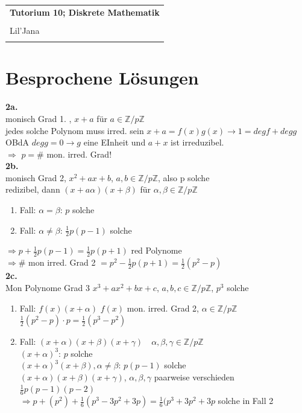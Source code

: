 \documentclass{article} %
\newcommand{\titulo}{Tutorium 10; Diskrete Mathematik}
\newcommand{\nombre}{Lil'Jana}
\begin{document}
\begin{tabular}{p{12cm}}
{{\Large\bf\titulo}}\\
\vspace{0.2cm}\\
 {\large\nombre}\\
 \vspace{0.1cm}
\end{tabular} 
\section*{Besprochene Lösungen}
\textbf{2a.} \\
monisch Grad 1. , $x +a $ für $a \in \mathbb{Z}/ p \mathbb{Z}$ \\
jedes solche Polynom muss irred. sein $x+a = f(x)g(x) \rightarrow 1 = deg f + deg g$  \\
OBdA $deg g = 0 \rightarrow g$ eine EInheit und $a+x$ ist irreduzibel. \\
$\Rightarrow$ $p = \#$ mon. irred. Grad! \\ \newline
\textbf{2b.}\\
monisch Grad 2, $x^2 +ax+b$, $a,b \in \mathbb{Z}/p \mathbb{Z}$, also p solche \\
redizibel, dann $(x+a\alpha)(x+\beta)$ für $\alpha, \beta \in \mathbb{Z}/ p \mathbb{Z}$
\begin{enumerate}
    \item Fall: $\alpha = \beta$: $p$ solche
    \item Fall: $\alpha \neq \beta$: $\frac{1}{2} p (p-1)$ solche
\end{enumerate}
$\Rightarrow p + \frac{1}{2}p(p-1) = \frac{1}{2}p(p+1)$ red Polynome \\
$\Rightarrow \# $ mon irred. Grad 2 $ = p^2 - \frac{1}{2}p(p+1) = \frac{1}{2}(p^2-p)$\\ 
\textbf{2c.} \\
Mon Polynome Grad 3 $x^3 + ax^2 + bx + c$, $a,b,c \in \mathbb{Z}/p \mathbb{Z}$, $p^3$ solche 
\begin{enumerate}
    \item Fall: $f(x) (x+\alpha)$ $f(x)$ mon. irred. Grad 2, $\alpha \in \mathbb{Z}/p \mathbb{Z} $ \\
    $\frac{1}{2}(p^2-p)\cdot p = \frac{1}{2} (p^3-p^2)$
    \item Fall: $(x+\alpha)(x+\beta)(x+\gamma) \quad \alpha, \beta, \gamma \in \mathbb{Z}/p \mathbb{Z}$ \\
    $(x+\alpha)^3$: $p$ solche \\
    $(x+\alpha)^3 (x+\beta), \alpha \neq \beta$: $p(p-1)$ solche \\
    $(x+\alpha)(x+\beta)(x+\gamma)$, $\alpha, \beta, \gamma$ paarweise verschieden $\frac{1}{6} p (p-1) (p-2)$ \\
    $\Rightarrow p+(p^2) + \frac{1}{6} (p^3-3p^2+3p) = \frac{1}{6} (p^3+3p^2+3p $ solche in Fall 2 
\end{enumerate}
\end{document}
